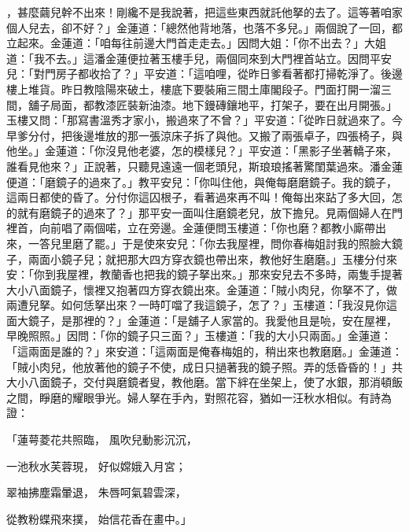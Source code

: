 \begin{showcontents}{}
，甚麼繭兒幹不出來！剛纔不是我說著，把這些東西就託他拏的去了。這等著咱家個人兒去，卻不好？」金蓮道：「總然他背地落，也落不多兒。」兩個說了一回，都立起來。金蓮道：「咱每往前邊大門首走走去。」因問大姐：「你不出去？」大姐道：「我不去。」這潘金蓮便拉著玉樓手兒，兩個同來到大門裡首站立。因問平安兒：「對門房子都收拾了？」平安道：「這咱哩，從昨日爹看著都打掃乾淨了。後邊樓上堆貨。昨日教陰陽來破土，樓底下要裝廂三間土庫閣段子。門面打開一溜三間，舖子局面，都教漆匠裝新油漆。地下鏝磚鑲地平，打架子，要在出月開張。」玉樓又問：「那寫書溫秀才家小，搬過來了不曾？」平安道：「從昨日就過來了。今早爹分付，把後邊堆放的那一張涼床子拆了與他。又搬了兩張卓子，四張椅子，與他坐。」金蓮道：「你沒見他老婆，怎的模樣兒？」平安道：「黑影子坐著轎子來，誰看見他來？」正說著，只聽見遠遠一個老頭兒，斯琅琅搖著驚閨葉過來。潘金蓮便道：「磨鏡子的過來了。」教平安兒：「你叫住他，與俺每磨磨鏡子。我的鏡子，這兩日都使的昏了。分付你這囚根子，看著過來再不叫！俺每出來跕了多大回，怎的就有磨鏡子的過來了？」那平安一面叫住磨鏡老兒，放下擔兒。見兩個婦人在門裡首，向前唱了兩個喏，立在旁邊。金蓮便問玉樓道：「你也磨？都教小廝帶出來，一答兒里磨了罷。」于是使來安兒：「你去我屋裡，問你春梅姐討我的照臉大鏡子，兩面小鏡子兒；就把那大四方穿衣鏡也帶出來，教他好生磨磨。」玉樓分付來安：「你到我屋裡，教蘭香也把我的鏡子拏出來。」那來安兒去不多時，兩隻手提著大小八面鏡子，懷裡又抱著四方穿衣鏡出來。金蓮道：「賊小肉兒，你拏不了，做兩遭兒拏。如何恁拏出來？一時叮噹了我這鏡子，怎了？」玉樓道：「我沒見你這面大鏡子，是那裡的？」金蓮道：「是舖子人家當的。我愛他且是喨，安在屋裡，早晚照照。」因問：「你的鏡子只三面？」玉樓道：「我的大小只兩面。」金蓮道：「這兩面是誰的？」來安道：「這兩面是俺春梅姐的，稍出來也教磨磨。」金蓮道：「賊小肉兒，他放著他的鏡子不使，成日只撾著我的鏡子照。弄的恁昏昏的！」共大小八面鏡子，交付與磨鏡者叟，教他磨。當下絆在坐架上，使了水銀，那消頓飯之間，睜磨的耀眼爭光。婦人拏在手內，對照花容，猶如一汪秋水相似。有詩為證：

「蓮萼菱花共照臨，  風吹兒動影沉沉，

一池秋水芙蓉現，  好似嫦娥入月宮；

翠袖拂塵霜暈退，  朱唇呵氣碧雲深，

從教粉蝶飛來撲，  始信花香在畫中。」


\end{showcontents}
